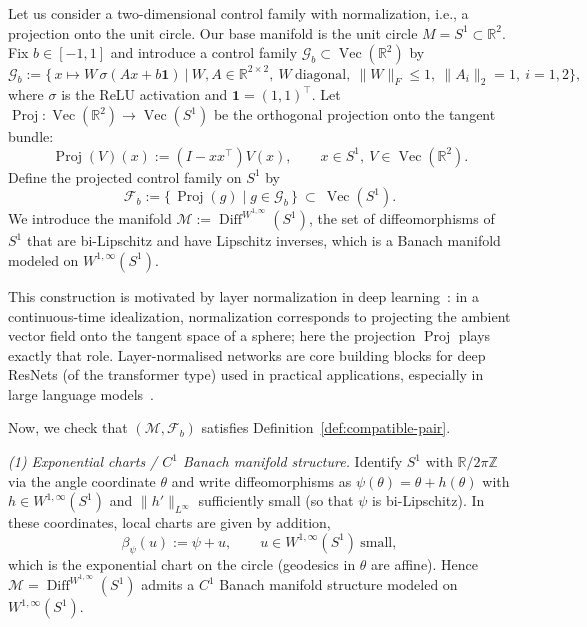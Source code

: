 \documentclass[12pt]{amsart}
\numberwithin{equation}{section}
\theoremstyle{remark}
\begin{document}
Let us consider a two-dimensional control family with normalization, i.e., a projection onto the unit circle.
Our base manifold is the unit circle \(M=S^1\subset \mathbb R^2\).
Fix \(b\in[-1,1]\) and introduce a control family \(\mathcal G_b\subset \operatorname{Vec}(\mathbb R^2)\) by
\begin{equation}
    \mathcal G_b:=\big\{\,x\mapsto W\,\sigma(Ax+b\mathbf 1)\ \big|\ W,A\in\mathbb R^{2\times 2},\ W\ \text{diagonal},\ \|W\|_F\le 1,\ \|A_i\|_2=1,\ i=1,2 \big\},
\end{equation}
where \(\sigma\) is the ReLU activation and \(\mathbf 1=(1,1)^\top\).
Let \(\operatorname{Proj}: \operatorname{Vec}(\mathbb R^2)\to \operatorname{Vec}(S^1)\) be the orthogonal projection onto the tangent bundle:
\begin{equation}
\operatorname{Proj}(V)(x):=(I-xx^\top)V(x),\qquad x\in S^1,\ V\in \operatorname{Vec}(\mathbb R^2).
\end{equation}
Define the projected control family on \(S^1\) by
\begin{equation}
\mathcal F_b:=\{\,\operatorname{Proj}(g)\mid g\in \mathcal G_b\,\}\ \subset\ \operatorname{Vec}(S^1).
\end{equation}
We introduce the manifold $\mathcal M := \operatorname{Diff}^{W^{1,\infty}}(S^1)$, the set of diffeomorphisms of $S^1$ that are bi-Lipschitz and have Lipschitz inverses, which is a Banach manifold modeled on $W^{1,\infty}(S^1)$.

This construction is motivated by layer normalization in deep learning~\cite{ba2016layer}: in a continuous-time idealization, normalization corresponds to projecting the ambient vector field onto the tangent space of a sphere; here the projection \(\operatorname{Proj}\) plays exactly that role.
Layer-normalised networks are core building blocks for deep ResNets (of the transformer type) 
used in practical applications, especially in large language models~\cite{ba2016layer,vaswani2017attention,xiong2020layer}.

Now, we check that $(\mathcal M,\mathcal F_b)$ satisfies Definition~\ref{def:compatible-pair}.

\emph{(1) Exponential charts / $C^1$ Banach manifold structure.}
Identify $S^1$ with $\mathbb R/2\pi\mathbb Z$ via the angle coordinate $\theta$ and write diffeomorphisms as
$\psi(\theta)=\theta+h(\theta)$ with $h\in W^{1,\infty}(S^1)$ and $\|h'\|_{L^\infty}$ sufficiently small (so that $\psi$ is bi-Lipschitz).
In these coordinates, local charts are given by addition,
\[
\beta_\psi(u):=\psi+u,\qquad u\in W^{1,\infty}(S^1)\ \text{small},
\]
which is the exponential chart on the circle (geodesics in $\theta$ are affine). Hence $\mathcal M=\operatorname{Diff}^{W^{1,\infty}}(S^1)$
admits a $C^1$ Banach manifold structure modeled on $W^{1,\infty}(S^1)$.
\end{document}
